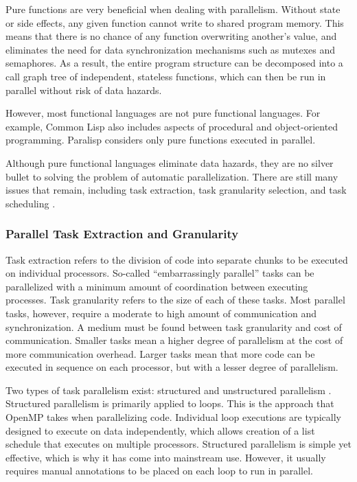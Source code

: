 \documentclass[abstracton]{scrartcl}
\begin{document}
Pure functions are very beneficial when dealing with parallelism. Without state or side effects, any given function cannot write to shared program memory. This means that there is no chance of any function overwriting another's value, and eliminates the need for data synchronization mechanisms such as mutexes and semaphores. As a result, the entire program structure can be decomposed into a call graph tree of independent, stateless functions, which can then be run in parallel without risk of data hazards.

However, most functional languages are not pure functional languages. For example, Common Lisp also includes aspects of procedural and object-oriented programming. Paralisp considers only pure functions executed in parallel.

Although pure functional languages eliminate data hazards, they are no silver bullet to solving the problem of automatic parallelization. There are still many issues that remain, including task extraction, task granularity selection, and task scheduling \autocites{Girkar:1995:ETP:210184.210189}{improving-task-scheduling}.

\subsubsection{Parallel Task Extraction and Granularity}

Task extraction refers to the division of code into separate chunks to be executed on individual processors. So-called ``embarrassingly parallel'' tasks can be parallelized with a minimum amount of coordination between executing processes. Task granularity refers to the size of each of these tasks. Most parallel tasks, however, require a moderate to high amount of communication and synchronization. A medium must be found between task granularity and cost of communication. Smaller tasks mean a higher degree of parallelism at the cost of more communication overhead. Larger tasks mean that more code can be executed in sequence on each processor, but with a lesser degree of parallelism.

Two types of task parallelism exist: structured and unstructured parallelism \autocite{Girkar:1995:ETP:210184.210189}. Structured parallelism is primarily applied to loops. This is the approach that OpenMP takes when parallelizing code. Individual loop executions are typically designed to execute on data independently, which allows creation of a list schedule that executes on multiple processors. Structured parallelism is simple yet effective, which is why it has come into mainstream use. However, it usually requires manual annotations to be placed on each loop to run in parallel.
\end{document}
